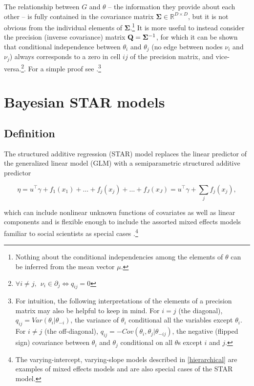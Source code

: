 The relationship between $G$ and $\theta$ -- the information they provide about each other -- is fully 
contained in the covariance matrix $\boldsymbol{\Sigma} \in \mathbb{R}^{D\times D}$, but it is not 
obvious from the individual elements of $\boldsymbol{\Sigma}$.\footnote{Nothing about the conditional 
independencies among the elements of $\theta$ can be inferred from the mean vector $\mu$.} It is 
more useful to instead consider the precision (inverse covariance) matrix 
$\mathbf{Q} =\boldsymbol{\Sigma}^{-1}$, for which it can be shown that conditional independence between 
$\theta_i$ and $\theta_j$ (no edge between nodes $\nu_i$ and $\nu_j$) always corresponds to a zero in 
cell $ij$ of the precision matrix, and vice-versa.\footnote{$\forall i \neq j, \:\: \nu_i \in \partial_j \iff q_{ij} = 0$}.  
For a simple proof see .\footnote{For intuition, the following interpretations of 
the elements of a precision matrix may also be helpful to keep in mind. For $i = j$ (the diagonal),  
$q_{ij} = Var(\theta_i | \theta_{-i})$, the variance of $\theta_i$ conditional all the variables except 
$\theta_i$. For $i \neq j$ (the off-diagonal), $q_{ij}  = -Cov(\theta_i, \theta_j | \theta_{-ij}) $, the negative 
(flipped sign) covariance between $\theta_i$ and $\theta_j$ conditional on all $\theta$s except $i$ and $j$.  }






\section{Bayesian STAR models}
\label{star}

\subsection{Definition}

The structured additive regression (STAR) model replaces the linear predictor of the generalized linear 
model (GLM) with a semiparametric structured additive predictor

\begin{equation*}
  \eta =  u^\intercal\gamma + f_1(x_1) + \ldots + f_j(x_j) + \ldots + f_J(x_J) =  u^\intercal\gamma + \sum_{j} f_j (x_j) ,
\end{equation*}

\noindent which can include nonlinear unknown functions of covariates as well as linear components 
and is flexible enough to include the assorted mixed effects models familiar to social scientists as 
special cases .\footnote{The varying-intercept, varying-slope models described in \ref{hierarchical} are examples of mixed effects models and are also special cases of the STAR model.} 


